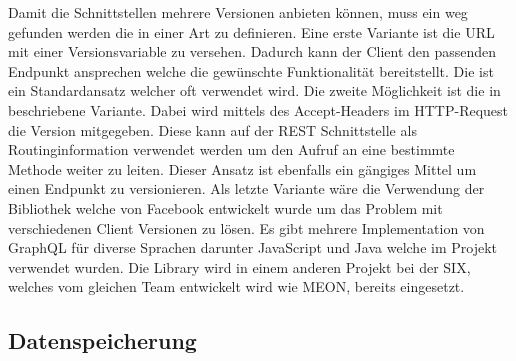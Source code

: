 Damit die Schnittstellen mehrere Versionen anbieten können, muss ein weg gefunden werden die in einer Art zu definieren. \newline Eine erste Variante ist die URL mit einer Versionsvariable zu versehen. Dadurch kann der Client den passenden Endpunkt ansprechen welche die gewünschte Funktionalität bereitstellt. Die ist ein Standardansatz welcher oft verwendet wird.\newline
Die zweite Möglichkeit ist die in \cite{contneg} beschriebene Variante. Dabei wird mittels des Accept-Headers im HTTP-Request die Version mitgegeben. Diese kann auf der REST Schnittstelle als Routinginformation verwendet werden um den Aufruf an eine bestimmte Methode weiter zu leiten. Dieser Ansatz ist ebenfalls ein gängiges Mittel um einen Endpunkt zu versionieren.\newline
Als letzte Variante wäre die Verwendung der \cite{gq} Bibliothek welche von Facebook entwickelt wurde um das Problem mit verschiedenen Client Versionen zu lösen. Es gibt mehrere Implementation von GraphQL für diverse Sprachen darunter JavaScript und Java welche im Projekt verwendet wurden. Die Library wird in einem anderen Projekt bei der SIX, welches vom gleichen Team entwickelt wird wie MEON, bereits eingesetzt.

\subsection{Datenspeicherung}

